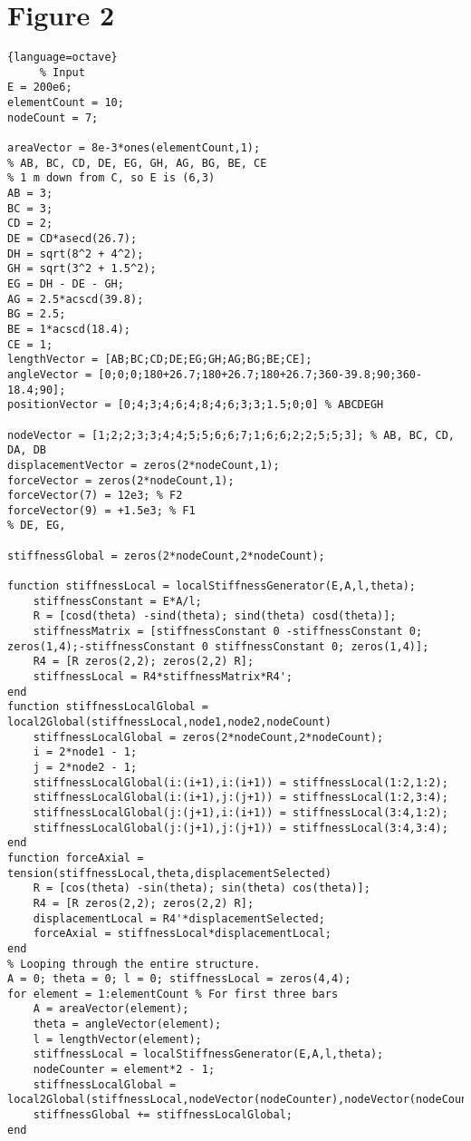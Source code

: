 \documentclass{article}
\begin{document}
\section{Figure 2} %
\label{sec:figure_}
\begin{lstlisting}{language=octave}
     % Input
E = 200e6;
elementCount = 10;
nodeCount = 7;

areaVector = 8e-3*ones(elementCount,1);
% AB, BC, CD, DE, EG, GH, AG, BG, BE, CE
% 1 m down from C, so E is (6,3)
AB = 3;
BC = 3;
CD = 2;
DE = CD*asecd(26.7);
DH = sqrt(8^2 + 4^2);
GH = sqrt(3^2 + 1.5^2);
EG = DH - DE - GH;
AG = 2.5*acscd(39.8);
BG = 2.5;
BE = 1*acscd(18.4);
CE = 1;
lengthVector = [AB;BC;CD;DE;EG;GH;AG;BG;BE;CE];
angleVector = [0;0;0;180+26.7;180+26.7;180+26.7;360-39.8;90;360-18.4;90];
positionVector = [0;4;3;4;6;4;8;4;6;3;3;1.5;0;0] % ABCDEGH

nodeVector = [1;2;2;3;3;4;4;5;5;6;6;7;1;6;6;2;2;5;5;3]; % AB, BC, CD, DA, DB
displacementVector = zeros(2*nodeCount,1);
forceVector = zeros(2*nodeCount,1);
forceVector(7) = 12e3; % F2
forceVector(9) = +1.5e3; % F1
% DE, EG,

stiffnessGlobal = zeros(2*nodeCount,2*nodeCount);

function stiffnessLocal = localStiffnessGenerator(E,A,l,theta);
    stiffnessConstant = E*A/l;
    R = [cosd(theta) -sind(theta); sind(theta) cosd(theta)];
    stiffnessMatrix = [stiffnessConstant 0 -stiffnessConstant 0; zeros(1,4);-stiffnessConstant 0 stiffnessConstant 0; zeros(1,4)];
    R4 = [R zeros(2,2); zeros(2,2) R];
    stiffnessLocal = R4*stiffnessMatrix*R4';
end
function stiffnessLocalGlobal = local2Global(stiffnessLocal,node1,node2,nodeCount)
    stiffnessLocalGlobal = zeros(2*nodeCount,2*nodeCount);
    i = 2*node1 - 1;
    j = 2*node2 - 1;
    stiffnessLocalGlobal(i:(i+1),i:(i+1)) = stiffnessLocal(1:2,1:2);
    stiffnessLocalGlobal(i:(i+1),j:(j+1)) = stiffnessLocal(1:2,3:4);
    stiffnessLocalGlobal(j:(j+1),i:(i+1)) = stiffnessLocal(3:4,1:2);
    stiffnessLocalGlobal(j:(j+1),j:(j+1)) = stiffnessLocal(3:4,3:4);
end
function forceAxial = tension(stiffnessLocal,theta,displacementSelected)
    R = [cos(theta) -sin(theta); sin(theta) cos(theta)];
    R4 = [R zeros(2,2); zeros(2,2) R];
    displacementLocal = R4'*displacementSelected;
    forceAxial = stiffnessLocal*displacementLocal;
end
% Looping through the entire structure.
A = 0; theta = 0; l = 0; stiffnessLocal = zeros(4,4);
for element = 1:elementCount % For first three bars
    A = areaVector(element);
    theta = angleVector(element);
    l = lengthVector(element);
    stiffnessLocal = localStiffnessGenerator(E,A,l,theta);
    nodeCounter = element*2 - 1;
    stiffnessLocalGlobal = local2Global(stiffnessLocal,nodeVector(nodeCounter),nodeVector(nodeCounter+1),nodeCount);
    stiffnessGlobal += stiffnessLocalGlobal;
end


\end{lstlisting}
\end{document}

